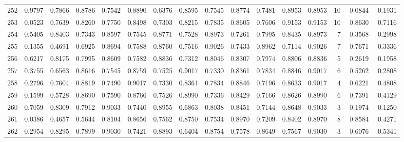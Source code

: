 \begin{tabular}{lrrrrrrrrrrrrrrr}
252 &      0.9797 &  0.7866 &  0.8786 &  0.7542 &  0.8890 &  0.6376 &  0.8595 &  0.7545 &  0.8774 &  0.7481 &   0.8953 &     0.8953 &     10 &                   -0.0844 &                    -0.1931 \\
253 &      0.0523 &  0.7639 &  0.8260 &  0.7750 &  0.8498 &  0.7303 &  0.8215 &  0.7835 &  0.8605 &  0.7606 &   0.9153 &     0.9153 &     10 &                    0.8630 &                     0.7116 \\
254 &      0.5405 &  0.8403 &  0.7343 &  0.8597 &  0.7545 &  0.8771 &  0.7528 &  0.8973 &  0.7261 &  0.7995 &   0.8435 &     0.8973 &      7 &                    0.3568 &                     0.2998 \\
255 &      0.1355 &  0.4691 &  0.6925 &  0.8694 &  0.7588 &  0.8760 &  0.7516 &  0.9026 &  0.7433 &  0.8962 &   0.7114 &     0.9026 &      7 &                    0.7671 &                     0.3336 \\
256 &      0.6217 &  0.8175 &  0.7995 &  0.8609 &  0.7582 &  0.8836 &  0.7312 &  0.8046 &  0.8307 &  0.7974 &   0.8806 &     0.8836 &      5 &                    0.2619 &                     0.1958 \\
257 &      0.3755 &  0.6563 &  0.8616 &  0.7545 &  0.8759 &  0.7525 &  0.9017 &  0.7330 &  0.8361 &  0.7834 &   0.8846 &     0.9017 &      6 &                    0.5262 &                     0.2808 \\
258 &      0.2796 &  0.7604 &  0.8819 &  0.7490 &  0.9017 &  0.7330 &  0.8361 &  0.7834 &  0.8846 &  0.7196 &   0.8633 &     0.9017 &      4 &                    0.6221 &                     0.4808 \\
259 &      0.1599 &  0.5728 &  0.8690 &  0.7590 &  0.8766 &  0.7526 &  0.8990 &  0.7336 &  0.8429 &  0.7166 &   0.8626 &     0.8990 &      6 &                    0.7391 &                     0.4129 \\
260 &      0.7059 &  0.8309 &  0.7912 &  0.9033 &  0.7440 &  0.8955 &  0.6863 &  0.8038 &  0.8451 &  0.7144 &   0.8648 &     0.9033 &      3 &                    0.1974 &                     0.1250 \\
261 &      0.0386 &  0.4657 &  0.5644 &  0.8104 &  0.8656 &  0.7562 &  0.8750 &  0.7534 &  0.8970 &  0.7209 &   0.8402 &     0.8970 &      8 &                    0.8584 &                     0.4271 \\
262 &      0.2954 &  0.8295 &  0.7899 &  0.9030 &  0.7421 &  0.8893 &  0.6404 &  0.8754 &  0.7578 &  0.8649 &   0.7567 &     0.9030 &      3 &                    0.6076 &                     0.5341 \\

\end{tabular}
